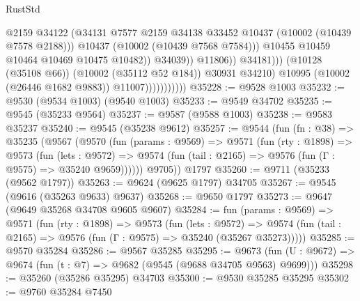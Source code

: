 \begin{lexlean}{RustStd}
\begin{coremodule}
                                                @2159
                                                @34122
                                                (@34131
                                                  @7577
                                                  @2159
                                                  @34138
                                                  @33452
                                                  @10437
                                                  (@10002 (@10439 @7578 @2188)))
                                                @10437
                                                (@10002 (@10439 @7568 @7584)))
                                              @10455
                                              @10459
                                              @10464
                                              @10469
                                              @10475
                                              @10482))
                                          @34039))
                                      @11806))
                                  @34181)))
                            (@10128 (@35108 @66))
                            (@10002 (@35112 @52 @184))
                            @30931
                            @34210)
                          @10995
                          (@10002 (@26446 @1682 @9883))
                          @11007)))))))))))
@35228 := @9528 @1003
@35232 := @9530 (@9534 @1003) (@9540 @1003)
@35233 := @9549 @34702
@35235 := @9545 (@35233 @9564)
@35237 := @9587 (@9588 @1003)
@35238 := @9583 @35237
@35240 := @9545 (@35238 @9612)
@35257 := @9544
    (fun (fn : @38) =>
    @35235
      (@9567
        (@9570
          (fun (params : @9569) =>
          @9571
            (fun (rty : @1898) =>
            @9573
              (fun (lets : @9572) =>
              @9574 (fun (tail : @2165) => @9576 (fun (Γ : @9575) => @35240 @9659))))))
        @9705))
    @1797
@35260 := @9711 (@35233 (@9562 @1797))
@35263 := @9624 (@9625 @1797) @34705
@35267 := @9545 (@9616 (@35263 @9633) @9637)
@35268 := @9650 @1797
@35273 := @9647 (@9649 @35268 @34708 @9605 @9607)
@35284 := fun (params : @9569) =>
  @9571
    (fun (rty : @1898) =>
    @9573
      (fun (lets : @9572) =>
      @9574 (fun (tail : @2165) => @9576 (fun (Γ : @9575) => @35240 (@35267 @35273)))))
@35285 := @9570 @35284
@35286 := @9567 @35285
@35295 := @9673
    (fun (U : @9672) => @9674 (fun (t : @7) => @9682 (@9545 (@9688 @34705 @9563) @9699)))
@35298 := @35260 (@35286 @35295) @34703
@35300 := @9530 @35285 @35295
@35302 := @9760 @35284 @7450

\end{coremodule}
\end{lexlean}
